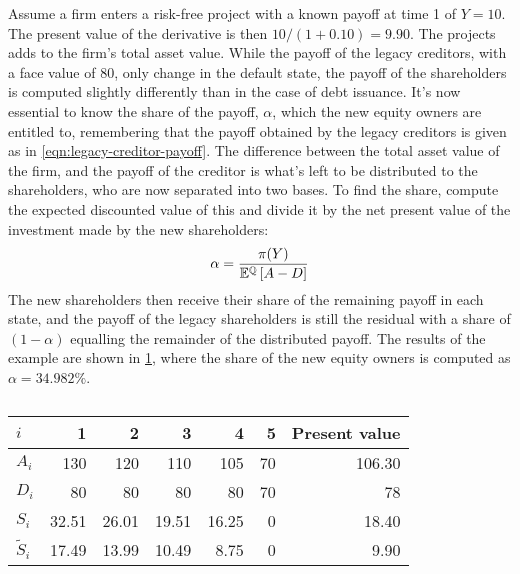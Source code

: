 \documentclass[main.tex]{subfiles}
\begin{document}
        Assume a firm enters a risk-free project with a known payoff at time 1 of $Y=10$. 
        The present value of the derivative is then $10/(1+0.10)=9.90$. 
        The projects adds to the firm's total asset value. 
        While the payoff of the legacy creditors, with a face value of 80, only change in the default state, the payoff of the shareholders is computed slightly differently than in the case of debt issuance. 
        It's now essential to know the share of the payoff, $\alpha$, which the new equity owners are entitled to, remembering that the payoff obtained by the legacy creditors is given as in \cref{eqn:legacy-creditor-payoff}. 
        The difference between the total asset value of the firm, and the payoff of the creditor is what's left to be distributed to the shareholders, who are now separated into two bases. 
        To find the share, compute the expected discounted value of this and divide it by the net present value of the investment made by the new shareholders:
        \begin{equation}
            \alpha = 
                \frac{
                    \pi(Y)
                }{
                    \mathbb{E}^{\mathbb{Q}}\left[A-D\right]
                }
        \end{equation}
        The new shareholders then receive their share of the remaining payoff in each state, and the payoff of the legacy shareholders is still the residual with a share of $(1-\alpha)$ equalling the remainder of the distributed payoff. 
        The results of the example are shown in \cref{tbl:equity-funding-payoff}, where the share of the new equity owners is computed as $\alpha = 34.982\%$.

        \begin{table}[H]
            \centering\begin{tabular}{l|rrrrr||r}
                $i$ & 1 & 2 & 3 & 4 & 5 & Present value \\
                \hline
                $A_{i}$ & 130 & 120 & 110 & 105 & 70 & 106.30 \\
                $D_{i}$ & 80 & 80 & 80 & 80 & 70 & 78 \\
                $S_{i}$ & 32.51 & 26.01 & 19.51 & 16.25 & 0 & 18.40 \\
                $\tilde{S}_{i}$ & 17.49 & 13.99 & 10.49 & 8.75 & 0 & 9.90 \\
            \end{tabular}
            \caption{}
            \label{tbl:equity-funding-payoff}
        \end{table}
\end{document}
